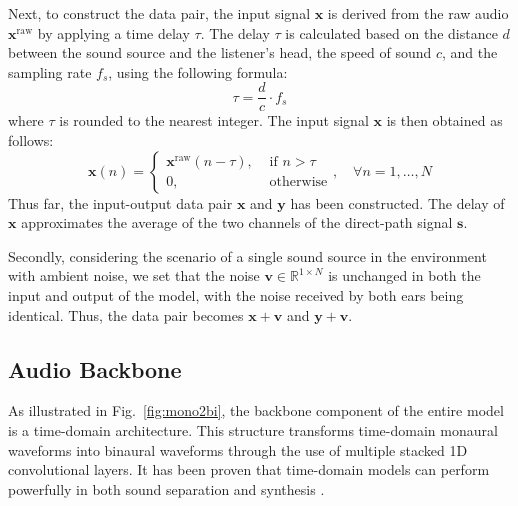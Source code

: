 \documentclass{IEEEtran}
\begin{document}
Next, to construct the data pair, the input signal $\mathbf{x}$ is derived from the raw audio $\mathbf{x}^\mathrm{raw}$ by applying a time delay $\tau$. The delay $\tau$ is calculated based on the distance $d$ between the sound source and the listener’s head, the speed of sound $c$, and the sampling rate $f_s$, using the following formula:
\begin{equation}\label{eq:tau}
\tau = \frac{d}{c} \cdot f_s
\end{equation}
where $\tau$ is rounded to the nearest integer. The input signal $\mathbf{x}$ is then obtained as follows:
\begin{equation}\label{eq:x_tau}
    \mathbf{x}(n) =
    \left\{\begin{array}{ll}
      \mathbf{x}^\mathrm{raw}(n-\tau),& \mbox{ if   } n > \tau \\
      0,& \mbox{ otherwise}
    \end{array}\right.,\quad \forall n = 1,\ldots, N
\end{equation}
Thus far, the input-output data pair $\mathbf{x}$ and $\mathbf{y}$ has been constructed. The delay of $\mathbf{x}$ approximates the average of the two channels of the direct-path signal $\mathbf{s}$.

Secondly, considering the scenario of a single sound source in the environment with ambient noise, we set that the noise $\mathbf{v} \in \mathbb{R}^{1 \times N}$ is unchanged in both the input and output of the model, with the noise received by both ears being identical. Thus, the data pair becomes $\mathbf{x} + \mathbf{v}$ and $\mathbf{y} + \mathbf{v}$.


\subsection{Audio Backbone} \label{subsec:backbone}
As illustrated in Fig.~\ref{fig:mono2bi}, the backbone component of the entire model is a time-domain architecture. This structure transforms time-domain monaural waveforms into binaural waveforms through the use of multiple stacked 1D convolutional layers. It has been proven that time-domain models can perform powerfully in both sound separation and synthesis \cite{luo2019conv,kong2021diffwave}.
\end{document}
